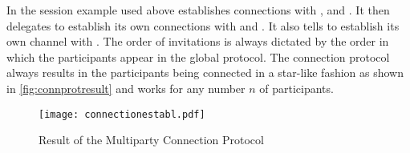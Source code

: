 In the session example used above  establishes connections with ,  and . It then delegates  to establish its own connections with  and . It also tells  to establish its own channel with . The order of invitations is always dictated by the order in which the participants appear in the global protocol. The connection protocol always results in the participants being connected in a star-like fashion as shown in \autoref{fig:connprotresult} and works for any number $n$ of participants.

\begin{figure}[H]
\begin{center}
\texttt{[image: connectionestabl.pdf]}
\caption{Result of the Multiparty Connection Protocol}
\label{fig:connprotresult}
\end{center}
\end{figure}










